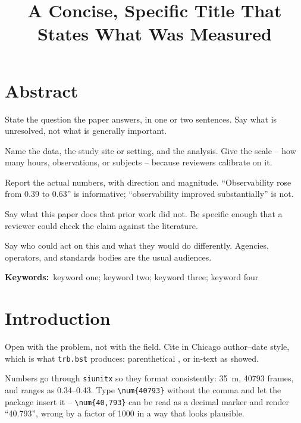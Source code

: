 \documentclass[10pt,numbered]{trbunofficial}
\title{A Concise, Specific Title That States What Was Measured}
\begin{document}
\maketitle

\section{Abstract}
State the question the paper answers, in one or two sentences. Say what is
unresolved, not what is generally important.

Name the data, the study site or setting, and the analysis. Give the scale --
how many hours, observations, or subjects -- because reviewers calibrate on it.

Report the actual numbers, with direction and magnitude. ``Observability
rose from \num{0.39} to \num{0.63}'' is informative; ``observability
improved substantially'' is not.

Say what this paper does that prior work did not. Be specific enough that a
reviewer could check the claim against the literature.

Say who could act on this and what they would do differently. Agencies,
operators, and standards bodies are the usual audiences.

\vspace{0.5\baselineskip}
\noindent\textbf{Keywords:}~keyword one; keyword two; keyword three; keyword four

\section{Introduction}
Open with the problem, not with the field. Cite in Chicago author--date style,
which is what \texttt{trb.bst} produces: parenthetical
\citep{example_article}, or in-text as \citet{example_report} showed.

Numbers go through \texttt{siunitx} so they format consistently:
\qty{35}{\metre}, \num{40793} frames, and ranges as \numrange{0.34}{0.43}.
Type \verb|\num{40793}| without the comma and let the package insert it --
\verb|\num{40,793}| can be read as a decimal marker and render
``40.793'', wrong by a factor of 1000 in a way that looks plausible.
\end{document}
